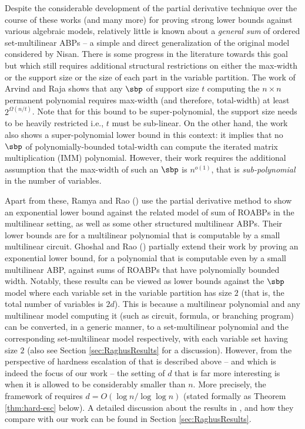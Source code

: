 \documentclass{article}
\begin{document}
Despite the considerable development of the partial derivative technique over the course of these works (and many more) for proving strong lower bounds against various algebraic models, relatively little is known about a \emph{general sum} of ordered set-multilinear ABPs -- a simple and direct generalization of the original model considered by Nisan. There is some progress in the literature towards this goal but which still requires additional structural restrictions on either the max-width or the support size or the size of each part in the variable partition.
The work \cite{ArvindR16} of Arvind and Raja shows that any $\sbp$ of support size $t$ computing the $n\times n$ permanent polynomial requires max-width (and therefore, total-width) at least $2^{\Omega(n/t)}$. 
Note that for this bound to be super-polynomial, the support size needs to be heavily restricted i.e., $t$ must be sub-linear. 
On the other hand, the work \cite{BDS23} also shows a super-polynomial lower bound in this context: it implies that no $\sbp$ of polynomially-bounded total-width can compute the iterated matrix multiplication (IMM) polynomial.
However, their work requires the additional assumption that the max-width of such an $\sbp$ is $n^{o(1)}$, that is \emph{sub-polynomial} in the number of variables. 

Apart from these, Ramya and Rao (\cite{RR20}) use the partial derivative method to show an exponential lower bound against the related model of sum of ROABPs in the multilinear setting, as well as some other structured multilinear ABPs.
Their lower bounds are for a multilinear polynomial that is computable by a small multilinear circuit.
Ghoshal and Rao (\cite{GR21}) partially extend their work by proving an exponential lower bound, for a polynomial that is computable even by a small multilinear ABP, against sums of ROABPs that have polynomially bounded width.
Notably, these results can be viewed as lower bounds against the $\sbp$ model where each variable set in the variable partition has size $2$ (that is, the total number of variables is $2d$).
This is because a multilinear polynomial and any multilinear model  computing it (such as circuit, formula, or branching program) can be converted, in a generic manner, to a set-multilinear polynomial and the corresponding set-multilinear model respectively, with each variable set having size $2$ (also see Section \ref{sec:RaghusResults} for a discussion). However, from the perspective of {hardness escalation of \cite{BDS23} that is described above} -- and which is indeed the focus of our work -- the setting of $d$ that is far more interesting is when it is allowed to be considerably smaller than $n$.
More precisely, the framework of \cite{BDS23} requires $d = O(\log n/\log \log n)$ (stated formally as Theorem \ref{thm:hard-esc} below).
A detailed discussion about the results in \cite{RR20}, \cite{GR21} and how they compare with our work can be found in Section \ref{sec:RaghusResults}.
\end{document}
